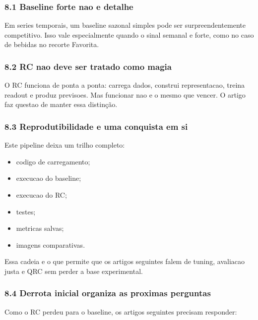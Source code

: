 \documentclass[12pt]{article}
\providecommand{\tightlist}{%
          \setlength{\itemsep}{0pt}\setlength{\parskip}{0pt}}
\begin{document}
\subsubsection{8.1 Baseline forte nao e detalhe}\label{81-baseline-forte-nao-e-detalhe}

Em series temporais, um baseline sazonal simples pode ser surpreendentemente competitivo. Isso vale especialmente quando o sinal semanal e forte, como no caso de bebidas no recorte Favorita.

\subsubsection{8.2 RC nao deve ser tratado como magia}\label{82-rc-nao-deve-ser-tratado-como-magia}

O RC funciona de ponta a ponta: carrega dados, construi representacao, treina readout e produz previsoes. Mas funcionar nao e o mesmo que vencer. O artigo faz questao de manter essa distinção.

\subsubsection{8.3 Reprodutibilidade e uma conquista em si}\label{83-reprodutibilidade-e-uma-conquista-em-si}

Este pipeline deixa um trilho completo:

\begin{itemize}
\tightlist
\item
  codigo de carregamento;
\item
  execucao do baseline;
\item
  execucao do RC;
\item
  testes;
\item
  metricas salvas;
\item
  imagens comparativas.
\end{itemize}

Essa cadeia e o que permite que os artigos seguintes falem de tuning, avaliacao justa e QRC sem perder a base experimental.

\subsubsection{8.4 Derrota inicial organiza as proximas perguntas}\label{84-derrota-inicial-organiza-as-proximas-perguntas}

Como o RC perdeu para o baseline, os artigos seguintes precisam responder:
\end{document}
